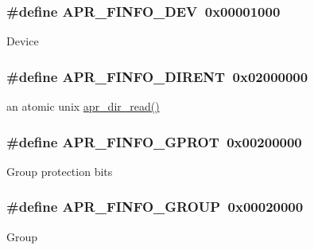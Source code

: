 \subsubsection[{\texorpdfstring{A\+P\+R\+\_\+\+F\+I\+N\+F\+O\+\_\+\+D\+EV}{APR_FINFO_DEV}}]{\setlength{\rightskip}{0pt plus 5cm}\#define A\+P\+R\+\_\+\+F\+I\+N\+F\+O\+\_\+\+D\+EV~0x00001000}\hypertarget{group__apr__file__stat_ga0890d31145211f62d38dd8e444b5660a}{}\label{group__apr__file__stat_ga0890d31145211f62d38dd8e444b5660a}
Device 
\subsubsection[{\texorpdfstring{A\+P\+R\+\_\+\+F\+I\+N\+F\+O\+\_\+\+D\+I\+R\+E\+NT}{APR_FINFO_DIRENT}}]{\setlength{\rightskip}{0pt plus 5cm}\#define A\+P\+R\+\_\+\+F\+I\+N\+F\+O\+\_\+\+D\+I\+R\+E\+NT~0x02000000}\hypertarget{group__apr__file__stat_gaac6679307cc735f2f0373960db96b931}{}\label{group__apr__file__stat_gaac6679307cc735f2f0373960db96b931}
an atomic unix \hyperlink{group__apr__dir_ga3e4ee253e0c712160bee10bfb9c8e4a8}{apr\+\_\+dir\+\_\+read()} 
\subsubsection[{\texorpdfstring{A\+P\+R\+\_\+\+F\+I\+N\+F\+O\+\_\+\+G\+P\+R\+OT}{APR_FINFO_GPROT}}]{\setlength{\rightskip}{0pt plus 5cm}\#define A\+P\+R\+\_\+\+F\+I\+N\+F\+O\+\_\+\+G\+P\+R\+OT~0x00200000}\hypertarget{group__apr__file__stat_gadfa294303e34528b1fcae1bc009140c1}{}\label{group__apr__file__stat_gadfa294303e34528b1fcae1bc009140c1}
Group protection bits 
\subsubsection[{\texorpdfstring{A\+P\+R\+\_\+\+F\+I\+N\+F\+O\+\_\+\+G\+R\+O\+UP}{APR_FINFO_GROUP}}]{\setlength{\rightskip}{0pt plus 5cm}\#define A\+P\+R\+\_\+\+F\+I\+N\+F\+O\+\_\+\+G\+R\+O\+UP~0x00020000}\hypertarget{group__apr__file__stat_ga8420798139d34a88678498aa848803ff}{}\label{group__apr__file__stat_ga8420798139d34a88678498aa848803ff}
Group 
